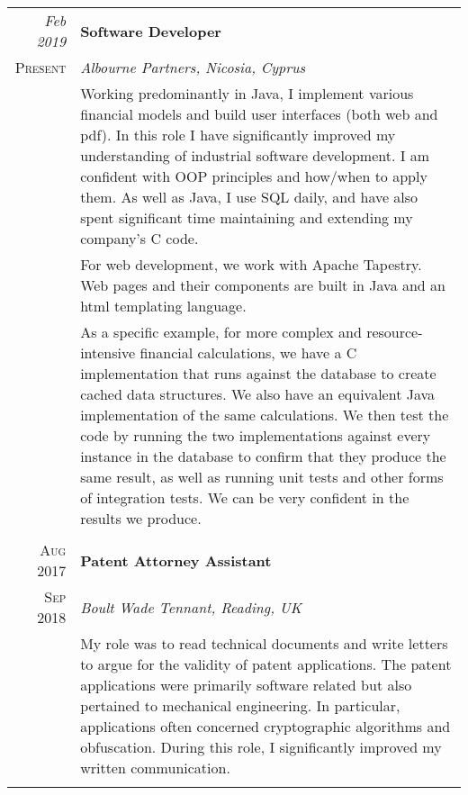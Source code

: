 \documentclass[a4paper,10pt]{article} %
\begin{document}
\begin{tabular}{r|p{16.5cm}}
\emph{Feb 2019} & \textbf{Software Developer} \\
\textsc{Present} & \emph{Albourne Partners, Nicosia, Cyprus}\\ 
& \footnotesize{Working predominantly in Java, I implement various financial models and build user interfaces (both web and pdf). In this role I have significantly improved my understanding of industrial software development. I am confident with OOP principles and how/when to apply them. As well as Java, I use SQL daily, and have also spent significant time maintaining and extending my company's C code.} \\
& \footnotesize{For web development, we work with Apache Tapestry. Web pages and their components are built in Java and an html templating language.} \\
& \footnotesize{As a specific example, for more complex and resource-intensive financial calculations, we have a C implementation that runs against the database to create cached data structures. We also have an equivalent Java implementation of the same calculations. We then test the code by running the two implementations against every instance in the database to confirm that they produce the same result, as well as running unit tests and other forms of integration tests. We can  be very confident in the results we produce.} \\
\multicolumn{2}{c}{} \\


\textsc{Aug 2017} & \textbf{Patent Attorney Assistant} \\
\textsc{Sep 2018} & \emph{Boult Wade Tennant, Reading, UK }\\
& \footnotesize{My role was to read technical documents and write letters to argue for the validity of patent applications. The patent applications were primarily software related but also pertained to mechanical engineering. In particular, applications often concerned cryptographic algorithms and obfuscation. During this role, I significantly improved my written communication.}\\
\multicolumn{2}{c}{} \\



\end{tabular}
\end{document}
